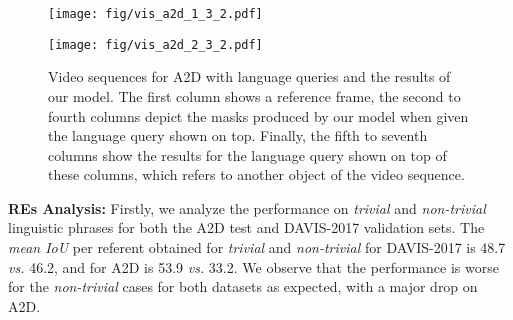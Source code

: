 \documentclass[10pt,twocolumn,letterpaper]{article}
\begin{document}
  













































\begin{figure*}[!tbp]


  \centering




        \begin{minipage}[t]{0.42075\textwidth}


    \texttt{[image: fig/vis\_a2d\_1\_3\_2.pdf]}
\label{fig:refcoco_best_testA}
  \end{minipage}
\begin{minipage}[t]{0.3213\textwidth}


\texttt{[image: fig/vis\_a2d\_2\_3\_2.pdf]}


  \end{minipage}
  \caption{Video sequences for A2D with language queries and the results of our model. The first column shows a reference frame, the second to fourth columns depict the masks produced by our model when given the language query shown on top. Finally, the fifth to seventh columns show the results for the language query shown on top of these columns, which refers to another object of the video sequence.}
  \label{fig:a2d-images}
\end{figure*}





\noindent
\textbf{REs Analysis:} Firstly, we analyze the performance on \textit{trivial} and \textit{non-trivial} linguistic phrases for both the A2D test and DAVIS-2017 validation sets. 
The \textit{mean IoU} per referent obtained for \textit{trivial} and \textit{non-trivial} for DAVIS-2017 is 48.7 \textit{vs.} 46.2, and for A2D is 53.9 \textit{vs.} 33.2.
We observe that the performance is worse for the \textit{non-trivial} cases for both datasets as expected, with a major drop on A2D. 
\end{document}
